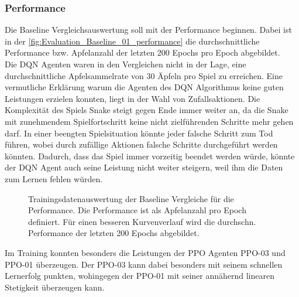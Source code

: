 \subsubsection{Performance}
Die Baseline Vergleichsauswertung soll mit der Performance beginnen. Dabei ist in der \autoref{fig:Evaluation_Baseline_01_performance} die durchschnittliche Performance bzw. Apfelanzahl der letzten 200 Epochs pro Epoch abgebildet.\\
Die DQN Agenten waren in den Vergleichen nicht in der Lage, eine durchschnittliche Apfelsammelrate von 30 Äpfeln pro Spiel zu erreichen. 
Eine vermutliche Erklärung warum die Agenten des DQN Algorithmus keine guten Leistungen erzielen konnten, liegt in der Wahl von Zufallsaktionen. Die Komplexität des Spiels Snake steigt gegen Ende immer weiter an, da die Snake mit zunehmendem Spielfortschritt keine nicht zielführenden Schritte mehr gehen darf. In einer beengten Spielsituation könnte jeder falsche Schritt zum Tod führen, wobei durch zufällige Aktionen falsche Schritte durchgeführt werden könnten. Dadurch, dass das Spiel immer vorzeitig beendet werden würde, könnte der DQN Agent auch seine Leistung nicht weiter steigern, weil ihm die Daten zum Lernen fehlen würden.
\begin{figure}[H]
	\centering
	
	\caption[Performance - Auswertung der Trainingsdaten der Baseline Vergleiche]{Trainingsdatenauswertung der Baseline Vergleiche für die Performance. Die Performance ist als Apfelanzahl pro Epoch definiert. Für einen besseren Kurvenverlauf wird die durchschn. Performance der letzten 200 Epochs abgebildet.}
	\label{fig:Evaluation_Baseline_01_performance}
\end{figure}
Im Training konnten besonders die Leistungen der PPO Agenten PPO-03 und PPO-01 überzeugen. 
Der PPO-03 kann dabei besonders mit seinem schnellen Lernerfolg punkten, wohingegen der PPO-01 mit seiner annähernd linearen Stetigkeit überzeugen kann.

